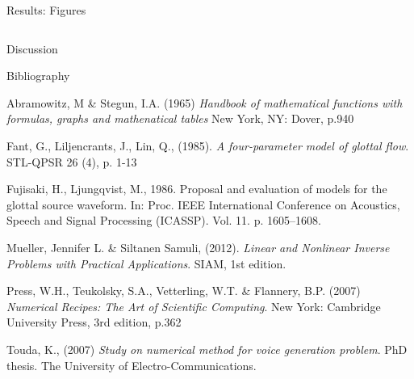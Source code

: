 \documentclass[final]{beamer}
\begin{document}
\begin{frame}[t]
\begin{columns}[t]
\begin{column}{.465\textwidth}
\begin{block}{Results: Figures}
\begin{columns}
\end{columns}


\end{block}


\begin{block}{Discussion}



\end{block}


\begin{block}{Bibliography}

\begin{scriptsize}


\begin{thebibliography}{9}

    Abramowitz, M \& Stegun, I.A. (1965)
    \emph{Handbook of mathematical functions with formulas, graphs and mathenatical tables}
    New York, NY: Dover, p.940

    Fant, G., Liljencrants, J., Lin, Q., (1985).
    \emph{A four-parameter model of glottal flow}.
    STL-QPSR 26 (4), p. 1-13
    
    Fujisaki, H., Ljungqvist, M., 1986.
    Proposal and evaluation of models for the glottal source waveform.
    In: Proc. IEEE International Conference on Acoustics, Speech and Signal Processing (ICASSP). Vol. 11. p. 1605–1608.
    
	Mueller, Jennifer L. \& Siltanen Samuli, (2012).
	\emph{Linear and Nonlinear Inverse Problems with Practical Applications}.
	SIAM, 1st edition.
    
    Press, W.H., Teukolsky, S.A., Vetterling, W.T. \& Flannery, B.P. (2007)
    \emph{Numerical Recipes: The Art of Scientific Computing}.
    New York: Cambridge University Press, 3rd edition, p.362
	
    Touda, K., (2007)
    \emph{Study on numerical method for voice generation problem}.
    PhD thesis.
    The University of Electro-Communications.
    

\end{thebibliography}
\end{scriptsize}
\end{block}
\end{column}
\end{columns}
\end{frame}
\end{document}
